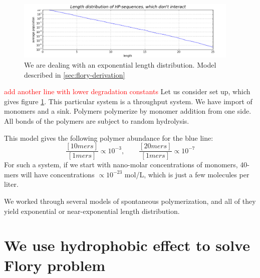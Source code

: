 \documentclass[12pt]{paper}
\newcommand{\pq}[1]{\left[ #1 \right]}
\newcommand{\red}[1]{\textcolor{red}{#1}}
\begin{document}
\begin{figure}[h!]
  \centering
  \includegraphics[width=0.95\textwidth]{pictures/flory.png} 
  \caption{We are dealing with an exponential length distribution. 
    Model described in \ref{sec:flory-derivation}}
  \label{fig:flory}
\end{figure}
\red{add another line with lower degradation constants}
Let us consider set up, which gives figure \ref{fig:flory}. 
This particular system is a throughput system. We have import of monomers and a sink. Polymers 
polymerize by monomer addition from one side. All bonds of the polymers are subject to random 
hydrolysis.

This model gives the following 
polymer abundance for the blue line:
\begin{equation}
  \frac{\pq{10mers}}{\pq{1mers}}\propto10^{-3},\qquad\frac{\pq{20mers}}{\pq{1mers}}\propto10^{-7}
\end{equation} 
For such a system, if we start with nano-molar concentrations of monomers, 40-mers will have 
concentrations $\propto 10^{-23} $ mol/L, which is just a few molecules per liter. 

We worked through several models of spontaneous polymerization, and all of they yield exponential 
or near-exponential length distribution.

\section{We use hydrophobic effect to solve Flory problem}
\end{document}
